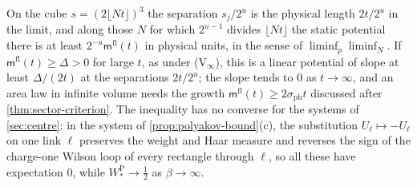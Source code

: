 \documentclass[11pt,a4paper]{amsart}
\theoremstyle{definition}
\theoremstyle{remark}
\numberwithin{equation}{section}
\newcommand{\cube}[1]{(2#1)^3}             %
\begin{document}
On the cube $s=\cube{\lfloor Nt\rfloor}$ the separation $s_j/2^u$ is the physical length $2t/2^u$ in the limit, and along those $N$ for which $2^{u-1}$ divides $\lfloor Nt\rfloor$ the static potential there is at least $2^{-u}\mathsf m^{\mathrm{fl}}(t)$ in physical units, in the sense of $\liminf_p\liminf_N$. If $\mathsf m^{\mathrm{fl}}(t)\ge\Delta>0$ for large $t$, as under \textup{(V$_\infty$)}, this is a linear potential of slope at least $\Delta/(2t)$ at the separations $2t/2^u$; the slope tends to $0$ as $t\to\infty$, and an area law in infinite volume needs the growth $\mathsf m^{\mathrm{fl}}(t)\ge2\sigma_{\mathrm{ph}}t$ discussed after \cref{thm:sector-criterion}. The inequality has no converse for the systems of \cref{sec:centre}: in the system of \cref{prop:polyakov-bound}\textup{(c)}, the substitution $U_\ell\mapsto-U_\ell$ on one link $\ell$ preserves the weight and Haar measure and reverses the sign of the charge-one Wilson loop of every rectangle through $\ell$, so all these have expectation $0$, while $W^{\mathrm P}_*\to\frac12$ as $\beta\to\infty$.
\end{document}
